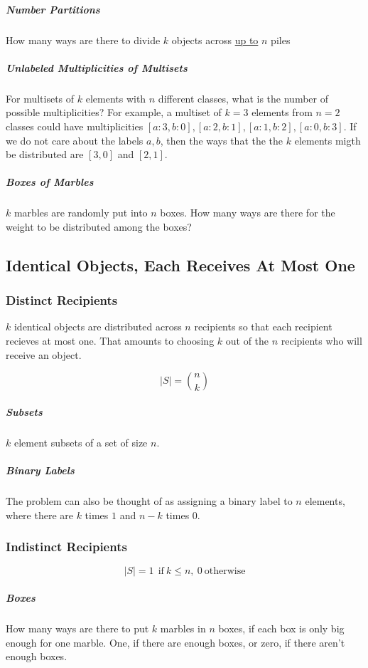 \subparagraph{Number Partitions} How many ways are there to divide $k$ objects across \underline{up to} $n$ piles

\subparagraph{Unlabeled Multiplicities of Multisets} For multisets of $k$ elements with $n$ different classes, what is the number of possible multiplicities? For example, a multiset of $k=3$ elements from $n=2$ classes could have multiplicities $[a:3,b:0], [a:2,b:1],[a:1,b:2],[a:0,b:3]$. If we do not care about the labels $a,b$, then the ways that the the $k$ elements migth be distributed are $[3,0]$ and $[2,1]$.

\subparagraph{Boxes of Marbles} $k$ marbles are randomly put into $n$ boxes. How many ways are there for the weight to be distributed among the boxes?



\subsection{Identical Objects, Each Receives At Most One}

\subsubsection{Distinct Recipients}
$k$ identical objects are distributed across $n$ recipients so that each recipient recieves at most one. That amounts to choosing $k$ out of the $n$ recipients who will receive an object.

\begin{equation}
|S| = { n \choose k}
\end{equation}


\subparagraph{Subsets} $k$ element subsets of a set of size $n$.

\subparagraph{Binary Labels} The problem can also be thought of as assigning a binary label to $n$ elements, where there are $k$ times $1$ and $n-k$ times 0.

\subsubsection{Indistinct Recipients}

\begin{equation}
|S| = 1\ \ \mathrm{if\ }k \leq n,\ 0\ \mathrm{otherwise}
\end{equation}  

\subparagraph{Boxes} How many ways are there to put $k$ marbles in $n$ boxes, if each box is only big enough for one marble. One, if there are enough boxes, or zero, if there aren't enough boxes.


